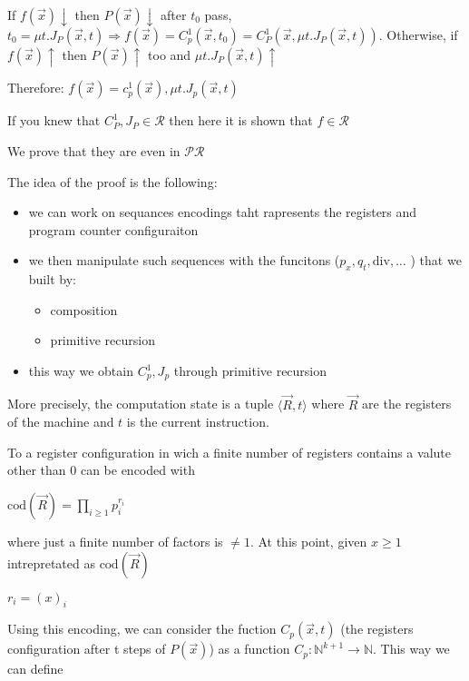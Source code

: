 \documentclass{amsbook}
\newcommand{\nat}{\ensuremath{\mathbb{N}}}
\theoremstyle{definition}
\theoremstyle{remark}
\numberwithin{section}{chapter}
\numberwithin{equation}{chapter}
\begin{document}
If $ f(\vec{x})\downarrow $ then $ P(\vec{x})\downarrow $ after $ t_0 $ pass, $ t_0 = \mu t. J_P(\vec{x},t) \Rightarrow f(\vec{x}) = C_p^1(\vec{x},t_0) = C_P^1(\vec{x}, \mu t.J_P(\vec{x},t)) $.
Otherwise, if $ f(\vec{x})\uparrow $ then $P(\vec{x})\uparrow$ too and $ \mu t.J_P(\vec{x},t)\uparrow $

Therefore:
$f(\vec{x}) = c_p^1(\vec{x}),\mu t.J_p(\vec{x},t)$


If you knew that $ C_P^1, J_P \in \mathcal{R} $ then here it is shown that $ f \in \mathcal{R} $

We prove that they are even in $ \mathcal{PR} $

The idea of the proof is the following:

\begin{itemize}
    \item we can work on sequances encodings taht rapresents the registers and program counter configuraiton
    \item we then manipulate such sequences  with the funcitons (\( p_x, q_t, \text{div}, \dots \) ) that we built by:
    \begin{itemize}
        \item composition
        \item primitive recursion
    \end{itemize}
    \item this way we obtain $C_p^1, J_p$ through primitive recursion
\end{itemize}
More precisely, the computation state is a tuple $\langle \vec{R}, t \rangle$ where $\vec{R}$ are the registers of the machine and $t$ is the current instruction.

To a register configuration  in wich a finite number of registers contains a valute other than 0 can be encoded with 

\begin{center}
$\text{cod}(\vec{R}) = \prod\limits_{i \geq 1}p_i^{r_i}$     
\end{center}

where just a finite number of factors is $\neq 1$. At this point, given $x \geq 1$ intrepretated as $\text{cod}(\vec{R})$

\begin{center}
    $r_i = (x)_i$
\end{center}

Using this encoding, we can consider the fuction $C_p(\vec{x},t)$ (the registers configuration after t steps of $P(\vec{x})$) as a function $C_p : \nat^{k+1} \rightarrow \nat$. This way we can define 
\end{document}
